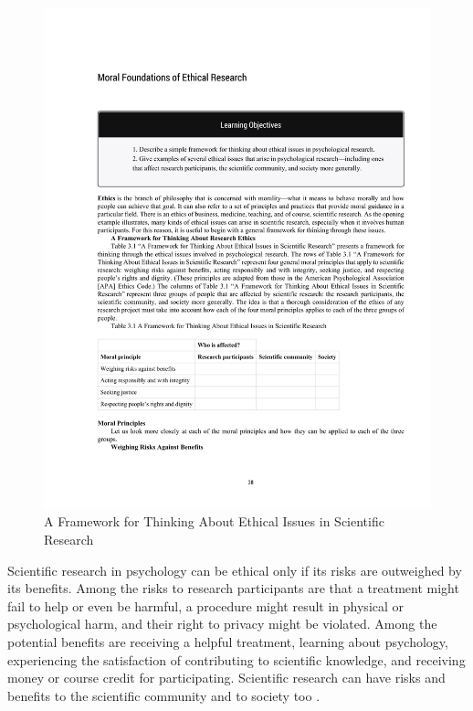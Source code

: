  \begin{figure}
       \includegraphics[width=\linewidth]{figures/C3ethicsTable.pdf}
       \caption{A Framework for Thinking About Ethical Issues in Scientific Research}
       \label{fig:EthicsTable}
 \end{figure}


Scientific research in psychology can be ethical only if its risks are outweighed by its benefits. Among the risks to research participants are that a treatment might fail to help or even be harmful, a procedure might result in physical or psychological harm, and their right to privacy might be violated. Among the potential benefits are receiving a helpful treatment, learning about psychology, experiencing the satisfaction of contributing to scientific knowledge, and receiving money or course credit for participating. Scientific research can have risks and benefits to the scientific community and to society too \citep{rosenthal_science_1994}. 


